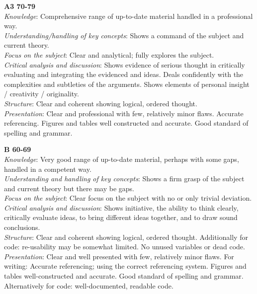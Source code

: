 \documentclass[11pt,]{article}
\begin{document}
{\bf A3 70-79}\\
\emph{Knowledge}: Comprehensive range of up-to-date material handled in a professional way.\\
\emph{Understanding/handling of key concepts}: Shows a command of the subject and current theory.\\
\emph{Focus on the subject}: Clear and analytical; fully explores the subject.\\
\emph{Critical analysis and discussion}: Shows evidence of serious thought in critically evaluating and integrating the evidenced and ideas. Deals confidently with the complexities and subtleties of the arguments. Shows elements of personal insight / creativity / originality.\\
\emph{Structure}: Clear and coherent showing logical, ordered thought.\\
\emph{Presentation}: Clear and professional with few, relatively minor flaws. Accurate referencing. Figures and tables well constructed and accurate. Good standard of spelling and grammar.



{\bf B 60-69} \\
\emph{Knowledge}: Very good range of up-to-date material, perhaps with some gaps, handled in a competent way.\\
\emph{Understanding and handling of key concepts}: Shows a firm grasp of the subject and current theory but there may be gaps.\\
\emph{Focus on the subject}: Clear focus on the subject with no or only trivial deviation.\\
\emph{Critical analysis and discussion}: Shows initiative, the ability to think clearly, critically evaluate ideas, to bring different ideas together, and to draw sound conclusions.\\
\emph{Structure}: Clear and coherent showing logical, ordered thought. Additionally for code: re-usability may be somewhat limited. No unused variables or dead code.\\
\emph{Presentation}: Clear and well presented with few, relatively minor flaws. For writing: Accurate referencing; using the correct referencing system. Figures and tables well-constructed and accurate. Good standard of spelling and grammar. Alternatively for code: well-documented, readable code.\\
\end{document}
